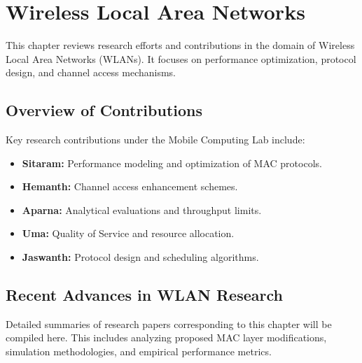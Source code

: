 \chapter{Wireless Local Area Networks}
\label{sec:chapter3}

This chapter reviews research efforts and contributions in the domain of Wireless Local Area Networks (WLANs). It focuses on performance optimization, protocol design, and channel access mechanisms.

\section{Overview of Contributions}
Key research contributions under the Mobile Computing Lab include:
\begin{itemize}
    \item \textbf{Sitaram:} Performance modeling and optimization of MAC protocols.
    \item \textbf{Hemanth:} Channel access enhancement schemes.
    \item \textbf{Aparna:} Analytical evaluations and throughput limits.
    \item \textbf{Uma:} Quality of Service and resource allocation.
    \item \textbf{Jaswanth:} Protocol design and scheduling algorithms.
\end{itemize}

\section{Recent Advances in WLAN Research}
Detailed summaries of research papers corresponding to this chapter will be compiled here. This includes analyzing proposed MAC layer modifications, simulation methodologies, and empirical performance metrics.